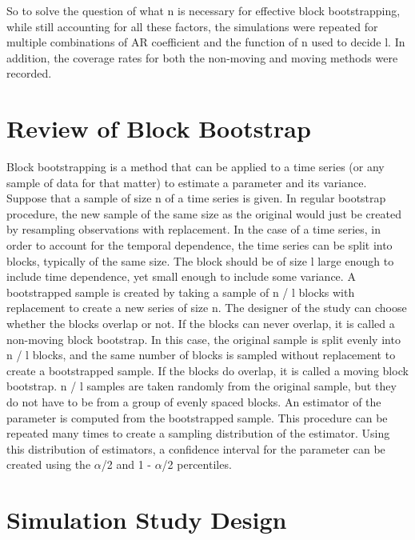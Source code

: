 \documentclass[12pt, letterpaper, titlepage]{article}
\begin{document}
So to solve the question of what n is necessary for effective block bootstrapping,
while still accounting for all these factors, the simulations were repeated for
multiple combinations of AR coefficient and the function of n used to decide l. In 
addition, the coverage rates
for both the non-moving and moving methods were recorded.

\section{Review of Block Bootstrap}
\label{sec:blkbootreview}

Block bootstrapping is a method that can be applied to a time series (or any sample of data for that matter) to estimate a parameter and its variance. Suppose that a sample of size n of a time series is given. In regular bootstrap procedure, the new sample of the same size as the original would just be created by resampling observations with replacement. In the case of a time series, in order to account for the temporal dependence, the time series can be split into blocks, typically of the same size. The block should be of size l large enough to include time dependence, yet small enough to include some variance. A bootstrapped sample is created by taking a sample of n / l blocks with replacement to create a new series of size n. The designer of the study can choose whether the blocks overlap or not. If the blocks can never overlap, it is called a non-moving block bootstrap. In this case, the original sample is split evenly into n / l blocks, and the same number of blocks is sampled without replacement to create a bootstrapped sample. If the blocks do overlap, it is called a moving block bootstrap. n / l samples are taken randomly from the original sample, but they do not have to be from a group of evenly spaced blocks. An estimator of the parameter is computed from the bootstrapped sample. This procedure can be repeated many times to create a sampling distribution of the estimator. Using this distribution of estimators, a confidence interval for the parameter can be created using the $\alpha$/2 and 1 - $\alpha$/2 percentiles.

\section{Simulation Study Design}
\label{sec:simdesign}
\end{document}
